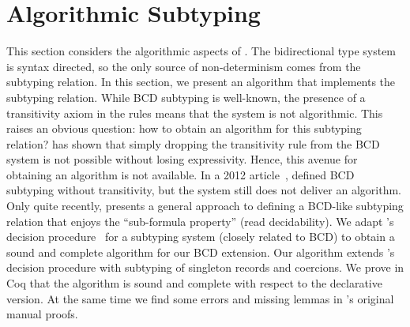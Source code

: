 
\section{Algorithmic Subtyping}
\label{sec:alg}

This section considers the algorithmic aspects of \namee. The bidirectional type
system is syntax directed, so the only source of non-determinism comes from the
subtyping relation. In this section, we present an algorithm that implements the
subtyping relation. While BCD subtyping is well-known, the presence of a
transitivity axiom in the rules means that the system is not algorithmic. This
raises an obvious question: how to obtain an algorithm for this subtyping
relation? \citet{Laurent12note} has shown that simply dropping the transitivity
rule from the BCD system is not possible without losing expressivity. Hence,
this avenue for obtaining an algorithm is not available. In a 2012
article~\citep{laurent2012intersection}, \citeauthor{laurent2012intersection}
defined BCD subtyping without transitivity, but the system still does not
deliver an algorithm. Only quite recently, \citet{Laurent18b} presents a general
approach to defining a BCD-like subtyping relation that enjoys the
``sub-formula property'' (read decidability).
We adapt \citeauthor{pierce1989decision}'s decision
procedure~\citep{pierce1989decision} for a subtyping system (closely related to
BCD) to obtain a sound and complete algorithm for our BCD extension. Our
algorithm extends \citeauthor{pierce1989decision}'s decision procedure with
subtyping of singleton records and coercions. We prove in Coq that the algorithm
is sound and complete with respect to the declarative version. At the same time
we find some errors and missing lemmas in \citeauthor{pierce1989decision}'s
original manual proofs.




